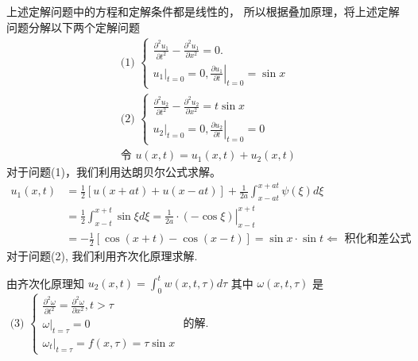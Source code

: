 \begin{questions}
 

\begin{solution}
上述定解问题中的方程和定解条件都是线性的， 所以根据叠加原理，将上述定解问题分解以下两个定解问题
$$
\begin{array}{l}
\text { (1) }\left\{\begin{array}{l}
\frac{\partial^{2} u_{1}}{\partial t^{2}}-\frac{\partial^{2} u_{1}}{\partial x^{2}}=0 . \\
\left.u_{1}\right|_{t=0}=0,\left.\frac{\partial u_{1}}{\partial t}\right|_{t=0}=\sin x
\end{array}\right. \\
\text { (2) }\left\{\begin{array}{l}
\frac{\partial^{2} u_{2}}{\partial t^{2}}-\frac{\partial^{2} u_{2}}{\partial x^{2}}=t \sin x \\
\left.u_{2}\right|_{t=0}=0,\left.\frac{\partial u_{2}}{\partial t}\right|_{t=0}=0
\end{array}\right. \\
\text { 令 } u(x, t)=u_{1}(x, t)+u_{2}(x, t)
\end{array}
$$
对于问题(1)，我们利用达朗贝尔公式求解。
$$
\begin{aligned}
u_{1}(x, t) & =\frac{1}{2}[u(x+a t)+u(x-a t)]+\frac{1}{2 a} \int_{x-a t}^{x+a t} \psi(\xi) d \xi \\
& =\frac{1}{2} \int_{x-t}^{x+t} \sin \xi d \xi=\left.\frac{1}{2 a} \cdot(-\cos \xi)\right|_{x-t} ^{x+t} \\
& =-\frac{1}{2}[\cos (x+t)-\cos (x-t)]=\sin x \cdot \sin t \Leftarrow \text { 积化和差公式 }
\end{aligned}
$$
对于问题(2), 我们利用齐次化原理求解.

由齐次化原理知 $ u_{2}(x, t)=\int _{0}^{t} w(x, t, \tau) d \tau $
其中 $ \omega(x, t, \tau) $ 是 $\text { (3) } \left\{\begin{array}{l}\frac{\partial^{2} \omega}{\partial t^{2}}=\frac{\partial^{2} \omega}{\partial x^{2}} , t>\tau \\ \left.\omega\right|_{t=\tau}=0 \\ \left.\omega_{t}\right|_{t=\tau}=f(x, \tau)=\tau \sin x\end{array}\right. $ 的解.


\end{solution}
\end{questions}
